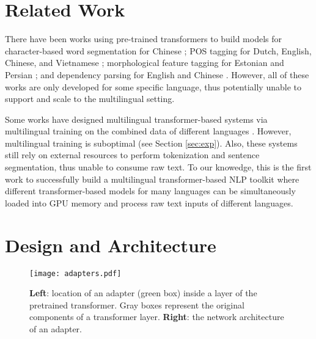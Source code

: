 \documentclass[11pt,a4paper]{article}
\begin{document}
\section{Related Work}
There have been works using pre-trained transformers to build models for character-based word segmentation for Chinese \citep{yang2019bert,tian-etal-2020-joint-chinese,che2020n}; POS tagging for Dutch, English, Chinese, and Vietnamese \citep{de2019bertje,tenney-etal-2019-bert,tian-etal-2020-joint-chinese,che2020n,nguyen-tuan-nguyen-2020-phobert}; morphological feature tagging for Estonian and Persian \citep{kittask2020evaluating,mohseni-tebbifakhr-2019-morphobert}; and dependency parsing for English and Chinese \citep{tenney-etal-2019-bert,che2020n}. However, all of these works are only developed for some specific language, thus potentially unable to support and scale to the multilingual setting.

Some works have designed multilingual transformer-based systems via multilingual training on the combined data of different languages \citep{tsai-etal-2019-small,kondratyuk-straka-2019-75,ustun-etal-2020-udapter}. However, multilingual training is suboptimal (see Section \ref{sec:exp}). Also, these systems still rely on external resources to perform tokenization and sentence segmentation, thus unable to consume raw text. To our knowedge, this is the first work to successfully build a multilingual transformer-based NLP toolkit where different transformer-based models for many languages can be simultaneously loaded into GPU memory and process raw text inputs of different languages.

\section{Design and Architecture}




\begin{figure}[ht]
    \centering
\texttt{[image: adapters.pdf]}
    \caption{\textbf{Left}: location of an adapter (green box) inside a layer of the pretrained transformer.  Gray boxes represent the original components of a transformer layer. \textbf{Right}: the network architecture of an adapter.}
    \label{fig:adapters}
\end{figure}
\end{document}
